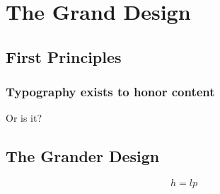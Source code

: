 \documentclass[b5paper]{memoir}
\begin{document}
\chapter{The Grand Design}
\section{First Principles}
\subsection{Typography exists to honor content}

\lipsum \begin{marginfigure}
    Or is it?
\end{marginfigure}

\section{The Grander Design}

\begin{equation}
    h = lp
\end{equation}
\end{document}

